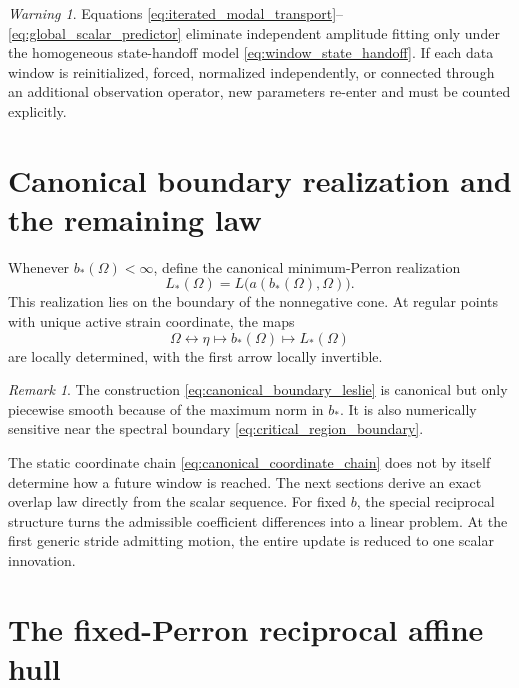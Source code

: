\documentclass[11pt]{amsart}
\numberwithin{equation}{section}
\theoremstyle{plain}
\theoremstyle{definition}
\theoremstyle{remark}
\newtheorem{remark}[theorem]{Remark}
\newtheorem{warning}[theorem]{Warning}
\begin{document}
\begin{warning}
\label{warn:homogeneous_transport_assumption}
Equations \eqref{eq:iterated_modal_transport}--\eqref{eq:global_scalar_predictor} eliminate independent amplitude fitting only under the homogeneous state-handoff model \eqref{eq:window_state_handoff}.  If each data window is reinitialized, forced, normalized independently, or connected through an additional observation operator, new parameters re-enter and must be counted explicitly.
\end{warning}

\section{Canonical boundary realization and the remaining law}
\label{sec:canonical_boundary}

Whenever $b_*(\Omega)<\infty$, define the canonical minimum-Perron realization
\begin{equation}
L_*(\Omega)=L\bigl(a(b_*(\Omega),\Omega)\bigr).
\label{eq:canonical_boundary_leslie}
\end{equation}
This realization lies on the boundary of the nonnegative cone.  At regular points with unique active strain coordinate, the maps
\begin{equation}
\Omega
\longleftrightarrow
\eta
\longmapsto
b_*(\Omega)
\longmapsto
L_*(\Omega)
\label{eq:canonical_coordinate_chain}
\end{equation}
are locally determined, with the first arrow locally invertible.

\begin{remark}
\label{rem:canonical_not_smooth_everywhere}
The construction \eqref{eq:canonical_boundary_leslie} is canonical but only piecewise smooth because of the maximum norm in $b_*$.  It is also numerically sensitive near the spectral boundary \eqref{eq:critical_region_boundary}.
\end{remark}

The static coordinate chain \eqref{eq:canonical_coordinate_chain} does not by itself determine how a future window is reached.  The next sections derive an exact overlap law directly from the scalar sequence.  For fixed $b$, the special reciprocal structure turns the admissible coefficient differences into a linear problem.  At the first generic stride admitting motion, the entire update is reduced to one scalar innovation.



\section{The fixed-Perron reciprocal affine hull}
\label{sec:reciprocal_affine_hull}
\end{document}
